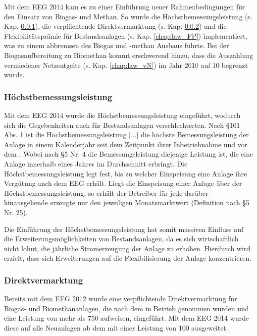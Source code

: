 Mit dem \gls{EEG} \SI{2014}{\relax} kam es zu einer Einführung neuer Rahmenbedingungen für den Einsatz von Biogas- und Methan. So wurde die Höchstbemessungsleistung (s. Kap. \ref{chap:law_Bem}), die verpflichtende Direktvermarktung (s. Kap. \ref{chap:law_DV}) und die Flexibilitätsprämie für Bestandsanlagen (s. Kap. \ref{chap:law_FP}) implementiert, was zu einem abbremsen des Biogas und -methan Ausbaus führte. Bei der Biogasaufbereitung zu Biomethan kommt erschwerend hinzu, dass die Auszahlung vermiedener Netzentgelte (s. Kap. \ref{chap:law_vN}) im Jahr \SI{2010}{\relax} auf \SI{10}{\Jahre} begrenzt wurde. \parencite{BDEW2019a}


\subsubsection{Höchstbemessungsleistung}\label{chap:law_Bem}

Mit dem \gls{EEG} \SI{2014}{\relax} wurde die Höchstbemessungsleistung eingeführt, wodurch sich die Gegebenheiten auch für Bestandsanlagen verschlechterten. Nach \S 101 Abs. 1 ist die \glqq Höchstbemessungsleistung [...] die höchste Bemessungsleistung der Anlage in einem Kalenderjahr seit dem Zeitpunkt ihrer Inbetriebnahme und vor dem .\grqq{} Wobei nach \S 5 Nr. 4 die Bemessungsleistung diejenige Leistung ist, die eine Anlage innerhalb eines Jahres im Durchschnitt erbringt. \parencite{BJV2014a} Die Höchstbemessungsleistung legt fest, bis zu welcher Einspeisung eine Anlage ihre Vergütung nach dem \gls{EEG} erhält. Liegt die Einspeisung einer Anlage über der Höchstbemessungsleistung, so erhält der Betreiber für jede darüber hinausgehende erzeugte \si{\kwh} nur den jeweiligen Monatsmarktwert (Definition nach \S 5 Nr. 25). \parencite{Loibl2014}\smallskip

Die Einführung der Höchstbemessungsleistung hat somit massiven Einfluss auf die Erweiterungsmöglichkeiten von Bestandsanlagen, da es sich wirtschaftlich nicht lohnt, die jährliche Stromerzeugung der Anlage zu erhöhen. Hierdurch wird erzielt, dass sich Erweiterungen auf die Flexibilisierung der Anlage konzentrieren. \parencite{DanielGromke2019}


\subsubsection{Direktvermarktung}\label{chap:law_DV}

Bereits mit dem \gls{EEG} \SI{2012}{\relax} wurde eine verpflichtende Direktvermarktung für Biogas- und Biomethananlagen, die nach dem  in Betrieb genommen wurden und eine Leistung von mehr als \SI{750}{\kw} aufweisen, eingeführt. Mit dem \gls{EEG} \SI{2014}{\relax} wurde diese auf alle Neuanlagen ab dem  mit einer Leistung von \SI{100}{\kw} ausgeweitet.\smallskip

